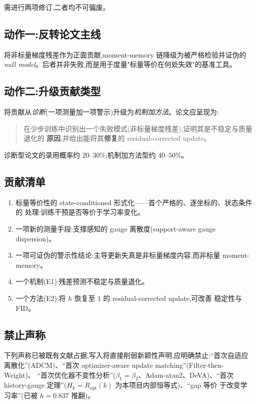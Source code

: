 \documentclass[UTF8,11pt,a4paper]{ctexart}
\begin{document}
需进行两项修订,二者均不可偏废。

\subsection{动作一:反转论文主线}
将非标量梯度残差作为正面贡献,moment-memory 链降级为被严格检验并证伪的
\emph{null model}。后者并非失败,而是用于度量"标量等价在何处失效"的基准工具。

\subsection{动作二:升级贡献类型}
将贡献从\emph{诊断}(一项测量加一项警示)升级为\emph{机制加方法}。论文应呈现为:
\begin{quote}
在少步训练中识别出一个失败模式(非标量梯度残差),证明其是不稳定与质量退化的
\textbf{原因},并给出能将其\textbf{修复}的 residual-corrected update。
\end{quote}
诊断型论文的录用概率约 $20$--$30\%$;机制加方法型约 $40$--$50\%$。

\subsection{贡献清单}
\begin{enumerate}[leftmargin=*,itemsep=2pt]
  \item 标量等价性的 state-conditioned 形式化——首个严格的、逐坐标的、状态条件的
        处理:训练干预是否等价于学习率变化。
  \item 一项新的测量手段:支撑感知的 gauge 离散度(support-aware gauge dispersion)。
  \item 一项可证伪的警示性结论:主导更新失真是非标量梯度内容,而非标量
        moment-memory。
  \item 一个机制(E1):残差预测不稳定与质量退化。
  \item 一个方法(E2):将 $h$ 恢复至 $1$ 的 residual-corrected update,可改善
        稳定性与 FID。
\end{enumerate}

\subsection{禁止声称}
下列声称已被既有文献占据,写入将直接削弱新颖性声明,应明确禁止:``首次自适应
离散化''(ADCM)、``首次 optimizer-aware update matching''(Filter-then-Weight)、
``首次优化器不变性分析''($\beta_1{=}\beta_2$、Adam-atan2、DeVA)、``首次
history-gauge 定理''($H_k=R_{\mathrm{opt}}(k)$ 为本项目内部恒等式)、``gap 等价
于改变学习率''(已被 $h=0.837$ 推翻)。
\end{document}
